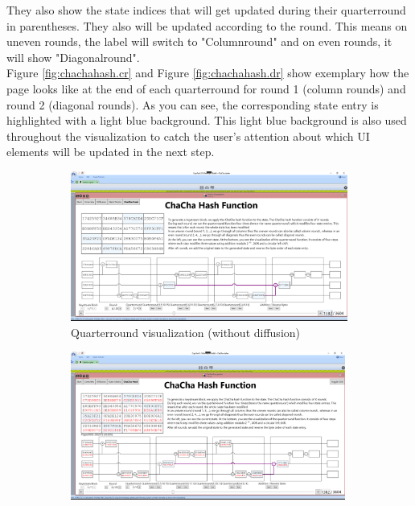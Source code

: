 They also show the state indices that will get updated during their quarterround in parentheses. They also will be updated according to the round. This means on uneven rounds, the label will switch to "Columnround" and on even rounds, it will show "Diagonalround". \\
Figure \ref{fig:chachahash.cr} and Figure \ref{fig:chachahash.dr} show exemplary how the page looks like at the end of each quarterround for round 1 (column rounds) and round 2 (diagonal rounds). As you can see, the corresponding state entry is highlighted with a light blue background. This light blue background is also used throughout the visualization to catch the user's attention about which UI elements will be updated in the next step.\\

\begin{figure}
\centering
\begin{subfigure}{\textwidth}
  \centering
  \includegraphics[width=\textwidth]{figures/ct2/chachahash/chachahash-mid-qr.png}
  \caption{Quarterround visualization (without diffusion)}
  \label{fig:chachahash.mid.qr.without.diffusion}
\end{subfigure}
\begin{subfigure}[t]{0.5\textwidth}
  \centering
  \includegraphics[width=0.99\textwidth]{figures/ct2/chachahash/chachahash-mid-qr-diffusion.png}

\end{subfigure}
\end{figure}
